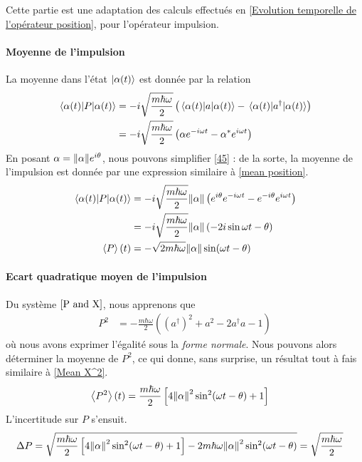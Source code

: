 \documentclass[11pt,oneside,a4paper]{article}
\newcommand{\h}{\ensuremath{\hbar}}
\begin{document}
Cette partie est une adaptation des calculs effectués en \ref{Evolution temporelle de l'opérateur position}, pour l'opérateur impulsion.

\paragraph{Moyenne de l'impulsion}

La moyenne dans l'état $\ket{\alpha(t)}$ est donnée par la relation
\begin{align}
  \expval{P}{\alpha(t)} &= -i\sqrt{\frac{m\h\omega}{2}}\left(\expval{a}{\alpha(t)}-\expval{a^\dagger}{\alpha(t)}\right)\\
  &= -i\sqrt{\frac{m\h\omega}{2}}\left(\alpha e^{-i\omega t}-\alpha^*e^{i\omega t}\right)\label{45}
\end{align}
En posant $\alpha = \norm{\alpha}e^{i\theta}$, nous pouvons simplifier \eqref{45} : de la sorte, la moyenne de l'impulsion est donnée par une expression similaire à \eqref{mean position}.
\begin{align}
  \expval{P}{\alpha(t)} &= -i\sqrt{\frac{m\h\omega}{2}}\norm{\alpha}\left(e^{i\theta}e^{-i\omega t}-e^{-i\theta}e^{i\omega t}\right)\\
  &= -i\sqrt{\frac{m\h\omega}{2}}\norm{\alpha} \left(-2i\sin\omega t-\theta\right)\\
  \expval{P}(t) &= -\sqrt{2m\h\omega}\norm{\alpha}\sin(\omega t-\theta)
\end{align} 

\paragraph{Ecart quadratique moyen de l'impulsion}

Du système $\eqref{P and X}$, nous apprenons que 
\begin{align}
  P^2 &= -\frac{m\h\omega}{2}\left(\left(a^\dagger\right)^2+a^2-2a^\dagger a-1\right)
\end{align}
où nous avons exprimer l'égalité sous la \emph{forme normale}. Nous pouvons alors déterminer la moyenne de $P^2$, ce qui donne, sans surprise, un résultat tout à fais similaire à \eqref{Mean X^2}.
\begin{align}
  \label{Mean P^2}
  \expval{P^2}(t)&= \frac{m\h\omega}{2}\left[4\norm{\alpha}^2\sin^2(\omega t-\theta)+1\right]
\end{align}
L'incertitude sur $P$ s'ensuit.
\begin{align}
  \Delta P &= \sqrt{\frac{m\h\omega}{2}\left[4\norm{\alpha}^2\sin^2(\omega t-\theta)+1\right] - 2m\h\omega\norm{\alpha}^2\sin^2(\omega t-\theta)} = \sqrt{\frac{m\h\omega}{2}}
\end{align}
\end{document}
